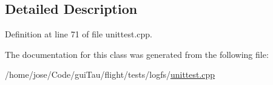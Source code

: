 \subsection{Detailed Description}


Definition at line 71 of file unittest.\-cpp.



The documentation for this class was generated from the following file\-:\begin{DoxyCompactItemize}
\item 
/home/jose/\-Code/gui\-Tau/flight/tests/logfs/\hyperlink{logfs_2unittest_8cpp}{unittest.\-cpp}\end{DoxyCompactItemize}
